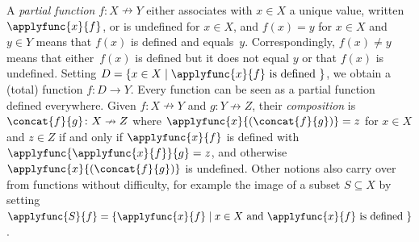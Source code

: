 
\label{def:partial_function} 
A \emph{partial function} $f \colon X \nrightarrow Y$
either associates with $x \in X$ a unique value, written $\applyfunc{x}{f}$, 
or is undefined for $x \in X$,
and $f(x) = y$ for $x \in X$ and $y \in Y$ means %
that $f(x)$ is defined and equals~$y$.
Correspondingly, $f(x) \ne y$ means 
that either~$f(x)$ is defined but it does not equal $y$ or that $f(x)$ is undefined.
Setting $D = \{ x \in X \mid \applyfunc{x}{f} \text{ is defined } \}$,
we obtain a (total) function $f \colon D \to Y$. 
Every  function can be seen as a partial function defined everywhere.
Given $f \colon X  \nrightarrow Y$ and $g \colon Y  \nrightarrow Z$,
their \emph{composition} is $\concat{f}{g} \colon X \nrightarrow Z$
where
$\applyfunc{x}{(\concat{f}{g})} = z$ for $x \in X$ and $z \in Z$
if and only if $\applyfunc{x}{f}$ is defined with $\applyfunc{\applyfunc{x}{f}}{g} = z$,
and otherwise $\applyfunc{x}{(\concat{f}{g})}$ is undefined. Other notions also carry over from functions without difficulty,
for example the image of a subset $S \subseteq X$
by setting $\applyfunc{S}{f} = \{ \applyfunc{x}{f} \mid x \in X \text{ and } \applyfunc{x}{f} \text{ is defined } \}$.

